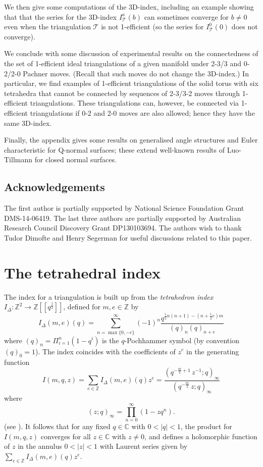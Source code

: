 \documentclass[12pt,reqno]{amsart}  %
\theoremstyle{definition}
\theoremstyle{remark}
\newcommand{\CT}{\mathcal{T}}
\def\be{  \begin{equation} }
\def\ee{  \end{equation} }
\def\ID{I_{\Delta}}
\newcommand{\T}{\mathcal{T}}
\def\Z{\mathbb Z}
\def\C{\mathbb C}
\begin{document}
We then give some computations of the 3D-index, including an example 
showing that that the series for the 3D-index $I^a_\CT(b)$ can sometimes 
converge for $b \ne 0$ even when the triangulation $\T$ is not 1-efficient 
(so the series for $I_\CT^0(0)$ does not converge).

We conclude with some discussion of experimental results on the 
connectedness of the set of 1-efficient ideal triangulations of a given 
manifold under 2-3/3 and 0-2/2-0 Pachner moves. (Recall that such moves
do not change the 3D-index.) In particular, we find examples of 1-efficient 
triangulations of the solid torus with six tetrahedra that cannot be 
connected by sequences of 2-3/3-2 moves through 1-efficient triangulations. 
These triangulations can, however, be connected via 1-efficient 
triangulations if 0-2 and 2-0 moves are also allowed; hence they have the 
same 3D-index.

Finally, the appendix gives some results on generalised angle structures 
and Euler characteristic for Q-normal surfaces; these extend well-known 
results of Luo-Tillmann \cite{LT} for closed normal surfaces. 

\subsection*{Acknowledgements} 
The first author is partially supported by National Science Foundation 
Grant DMS-14-06419. The last three authors are partially supported by 
Australian Research Council Discovery Grant DP130103694. The authors 
wish to thank Tudor Dimofte and Henry Segerman for useful discussions 
related to this paper.


\section{The tetrahedral index}

The index for a triangulation is built up from the \emph{tetrahedron index}  
$\ID \colon \mathbb{Z}^2\rightarrow \mathbb{Z}[[q^\frac{1}{2}]]$, defined 
for $m,e \in \Z$ by
\be
\ID(m,e)(q)=\sum^{\infty}_{n=\max\{0,-e\}}(-1)^n 
\frac{q^{\frac{1}{2}n(n+1)-(n+\frac{1}{2}e)m}}{(q)_n(q)_{n+e}}
\label{ID_def}
\ee
where $(q)_n=\Pi_{i=1}^{n}(1-q^i)$ is the $q$-Pochhammer symbol 
(by convention $(q)_0=1$). The index coincides with the coefficients 
of $z^e$ in the generating function
\be
I(m,q,z)=\sum_{e \in \Z}  \ID(m,e)(q) z^e 
= \frac{(q^{-\frac{m}{2}+1} 
\, z^{-1};q)_\infty}{(q^{-\frac{m}{2}} \,z;q)_\infty}
\label{ID_gen_func}
\ee
where
\be
(z; q)_\infty = \prod_{n=0}^\infty (1- z q^n) .
\label{zq-Poch}
\ee
(see \cite{Gar}). It follows that for any fixed $q \in \C$ with $0 < |q|<1$,
 the product for $I(m,q,z)$ converges for all $z\in \C$ with $z\ne 0$, 
and defines a holomorphic function of $z$ in the annulus $0<|z|<1$
with Laurent series given  by $\sum_{e \in \Z}  \ID(m,e)(q) z^e$.
\end{document}
